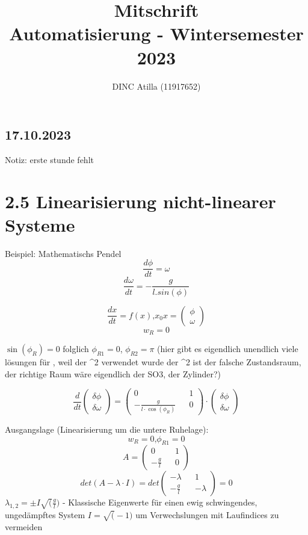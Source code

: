 \documentclass[a4paper]{article}
\title{Mitschrift\\Automatisierung - Wintersemester 2023}
\author{DINC Atilla (11917652)}
\begin{document}
\normalsize
\maketitle


\subsection*{17.10.2023}
Notiz: erste stunde fehlt

\section*{2.5 Linearisierung nicht-linearer Systeme}
Beispiel: Mathematischs Pendel
\[\frac{d\phi}{dt}= \omega\]
\[\frac{d\omega}{dt} = -\frac{g}{l.sin(\phi)}\]

\[\frac{dx}{dt} = f(x)\text{,} x_{0}  x=\begin{pmatrix} \phi\\ \omega\end{pmatrix}\]
 \[ w_{R}=0\]

 $\sin(\phi_{R})=0$ folglich $\phi_{R1}=0$, $\phi_{R2}=\pi$ (hier gibt es eigendlich unendlich viele lösungen für \phi, weil der \R^2 verwendet wurde
der \R^2 ist der falsche Zustandsraum, der richtige Raum wäre eigendlich der SO3, der Zylinder?)

\[\frac{d}{dt}\begin{pmatrix} \delta\phi\\ \delta\omega\end{pmatrix}=\begin{pmatrix}
0 && 1\\
-\frac{g}{l\cdot \cos(\phi_{R})} && 0
\end{pmatrix}
\cdot \begin{pmatrix} \delta\phi\\ \delta\omega\end{pmatrix}\]

Ausgangslage (Linearisierung um die untere Ruhelage):
\[ w_{R}=0\text{,} \phi_{R1}=0 \]
\[ A=\begin{pmatrix}
0 && 1\\
-\frac{g}{l} && 0
\end{pmatrix}\]
\[det(A-\lambda\cdot I)=det\begin{pmatrix}
-\lambda && 1\\
-\frac{g}{l} && -\lambda
\end{pmatrix} =0\]
$\lambda_{1,2}=\pm I\sqrt(\frac{g}{l})$  - Klassische Eigenwerte für einen ewig schwingendes, ungedämpftes System
$I=\sqrt(-1)$  um Verwechslungen mit Laufindices zu vermeiden
\end{document}

